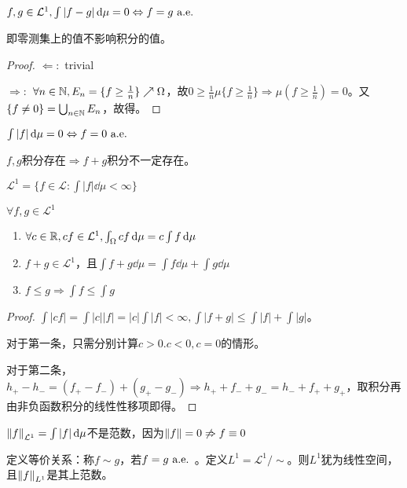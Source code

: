 \documentclass{ctexbook}
\begin{document}
\begin{Eg}
  $f,g\in\mathcal{L}^{1},\int |f-g|\,\mathrm{d}\mu=0\Leftrightarrow f=g\text{ a.e. }$
\end{Eg}
即零测集上的值不影响积分的值。

\begin{proof}
  $\Leftarrow:$ trivial

  $\Rightarrow:$ $\forall n\in\mathbb{N},E_{n}=\{f\geq \frac{1}{n}\}\nearrow \Omega$，故$0\geq\frac{1}{n}\mu\{f\geq\frac{1}{n}\}\Rightarrow \mu(f\geq \frac{1}{n})=0$。又$\{f\neq 0\}=\bigcup_{n\in\mathbb{N}}E_{n}$，故得。
\end{proof}

\begin{Cor}
  $\int |f|\,\mathrm{d}\mu=0\Leftrightarrow f=0\text{ a.e. }$
\end{Cor}

$f,g$积分存在$\Rightarrow f+g$积分不一定存在。

\begin{Def}
  $\mathcal{L^{1}}=\{f\in\mathcal{L}:\int|f|\dd\mu<\infty\}$
\end{Def}

\begin{Lemma}
  $\forall f,g\in\mathcal{L}^{1}$
  \begin{enumerate}
  \item $\forall c\in\mathbb{R},cf\in \mathcal{L}^{1},\int_{\Omega}cf\,\mathrm{d}\mu=c\int f\,\mathrm{d}\mu$
  \item $f+g\in\mathcal{L^{1}}$，且$\int f+g\dd\mu=\int f\dd\mu+\int g\dd\mu$
  \item $f\leq g\Rightarrow \int f\leq \int g$
  \end{enumerate}
\end{Lemma}

\begin{proof}
  $\int |cf|=\int |c||f|=|c|\int |f|<\infty,\int|f+g|\leq \int |f|+\int|g|$。

  对于第一条，只需分别计算$c>0.c<0,c=0$的情形。

  对于第二条，$h_{+}-h_{-}=(f_{+}-f_{-})+(g_{+}-g_{-})\Rightarrow h_{+}+f_{-}+g_{-}=h_{-}+f_{+}+g_{+}$，取积分再由非负函数积分的线性性移项即得。
\end{proof}

$\left\|f\right\|_{\mathcal L^{1}}=\int |f|\,\mathrm{d}\mu$不是范数，因为$\left\|f\right\|=0\not\Rightarrow f\equiv 0$

\begin{Def}
  定义等价关系：称$f\sim g$，若$f=g\text{ a.e. }$。定义$L^{1}=\mathcal L^{1}/\sim$。则$L^{1}$犹为线性空间，且$\left\|f\right\|_{L^{1}}$是其上范数。
\end{Def}
\end{document}
